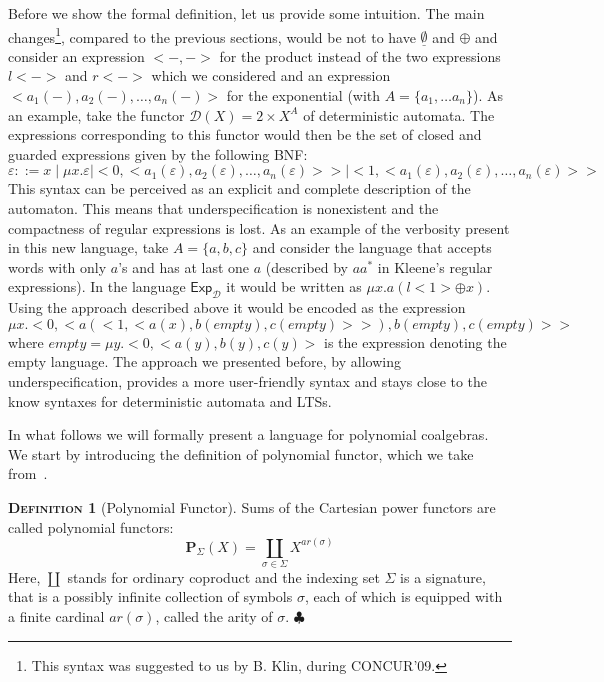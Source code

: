 \documentclass{LMCS}
\newcommand\D{\mathcal{D}}
\newcommand\E\varepsilon
\newcommand\Exp{\mathsf{Exp}}
\newcommand\Pol{\mathbf{P}}
\newcommand\emp{\underline\emptyset}
\theoremstyle{definition}
\newtheorem{mydefinition}{\textsc{Definition}}[section]
\theoremstyle{plain}
\theoremstyle{plain}
\theoremstyle{plain}
\theoremstyle{plain}
\theoremstyle{definition}
\theoremstyle{definition}
\newenvironment{definition}{
\begin{mydefinition}}
    {\hfill$\clubsuit$\end{mydefinition}}
\begin{document}
Before we show the formal definition, let us provide some intuition. 
The main changes\footnote{This syntax was suggested to us by B. Klin,
during CONCUR'09.}, compared to the previous sections, would be not to 
have $\emp$ and $\oplus$ and consider an expression $<-,->$ for the
product instead of the two expressions $l<->$ and $r<->$ which we
considered and an expression $<a_1(-), a_2(-), \ldots, a_n(-)>$ for
the exponential (with $A=\{a_1,\dots a_n\}$). As an example, take the
functor $\D(X) =
2\times X^A$ of deterministic automata. The expressions corresponding
to this functor would then be the set of closed and guarded
expressions given by the following BNF:
\[
\E::= x \mid \mu x.\E \mid <0, <a_1(\E), a_2(\E), \ldots, a_n(\E)>>
\mid <1,<a_1(\E), a_2(\E), \ldots, a_n(\E)>>
\]
This syntax can be perceived as an explicit and complete description
of the automaton. This means that underspecification is nonexistent and
the compactness of regular expressions is lost. As an example of the
verbosity present in this new language, take $A=\{a,b,c\}$ and
consider the language that accepts words with only $a$'s and has at
last one $a$ (described by $aa^*$ in Kleene's regular expressions). In
the language $\Exp_\D$ it would be written as $\mu x. a(l<1>\oplus x)$.
Using the approach described above it would be encoded as the
expression
\[
\mu x.  <0,
<a(<1,<a(x),b(\mathit{empty}),c(\mathit{empty})>>),b(\mathit{empty}),c(\mathit{empty})>>
\]
where $\mathit{empty}= \mu y. <0,<a(y), b(y), c(y)>$ is the expression
denoting the empty language. The approach we presented before, by
allowing underspecification, provides
a more user-friendly syntax and stays close to the know syntaxes for
deterministic automata and LTSs. 

In what follows we will formally present a language for polynomial
coalgebras. We start by introducing the definition of polynomial functor, which we
take from~\cite{adamek06}. 

\begin{definition}[Polynomial Functor]
Sums of the Cartesian power functors are called polynomial functors:
\[
\Pol_\Sigma(X) = \coprod_{\sigma \in \Sigma} X^{\mathit{ar}(\sigma)}
\]
Here, $\coprod$ stands for ordinary coproduct and 
 the indexing set $\Sigma$ is a signature, that is a possibly infinite
collection of symbols $\sigma$, each of 
which is equipped with a finite cardinal $\mathit{ar}(\sigma)$, called
the arity of $\sigma$. 
\end{definition}
\end{document}

